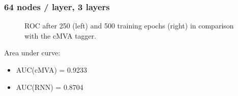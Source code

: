 \documentclass{beamer}
\begin{document}
\begin{frame}
  \frametitle{64 nodes / layer, 3 layers}

  \begin{figure}[htb]
    \centering

    \caption{ROC after 250 (left) and 500 training epochs (right) in comparison with the cMVA tagger.}
  \end{figure}

  Area under curve:
  \begin{itemize}
  \item AUC(cMVA) = 0.9233
  \item AUC(RNN) = 0.8704
  \end{itemize}
  
\end{frame}
\end{document}
